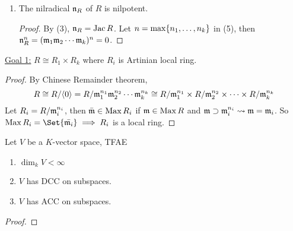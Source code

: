 \begin{prop}
\begin{enumerate}[(1)]
\begin{proof}
        So there exists $x \in J_0$ s.t. $x \mf_1^{n_1}\mf_2^{n_2} \dotsm \mf_k^{n_k} \ne 0$.
        We know that $\gen{x} \subseteq J_0 \leadsto J_0 = \gen{x}$.
        We also find that $x \mf_1^{n_1+1}\mf_2^{n_2+1} \dotsm \mf_k^{n_k+1} =
        x \mf_1^{n_1}\mf_2^{n_2} \dotsm \mf_k^{n_k} \ne 0$.
        This implies $x\mf_1\mf_2 \dotsm \mf_k \in \Sc$. But
        $x\mf_1\mf_2 \dotsm \mf_k \subseteq \gen{x} = J_0 \implies$
        $x\mf_1\mf_2 \dotsm \mf_k = \gen{x} = xR$.
        Write
        \[
          (\mf_1\mf_2 \dotsm \mf_k) x R = xR \leadsto
          (\mf_1 \cap \mf_2 \cap \dotsm \cap \mf_k) x R = xR \leadsto
          (\Jac R) xR = xR
        \]
        By Nakayama's lemma, $xR = 0 \implies x = 0$, which is a contradiction.
      \end{proof}
    \item The nilradical $\mathfrak{n}_R$ of $R$ is nilpotent.
      \begin{proof}
        By (3), $\mathfrak{n}_R = \operatorname{Jac} R$. Let $n = \max \lbrace n_1, \dots, n_k\rbrace$ in (5),
        then $\mathfrak{n}_R^n = (\mathfrak{m}_1\mathfrak{m}_2 \dotsm\mathfrak{m}_k)^n = 0$.
      \end{proof}
  \end{enumerate}
\end{prop}

\underline{Goal 1:} $R \cong R_1 \times R_k$ where $R_i$ is Artinian local ring.
\begin{proof}
  By Chinese Remainder theorem,
  \[
    R \cong {R}/{\langle0\rangle} = {R}/{\mathfrak{m}_1^{n_1}\mathfrak{m}_2^{n_2} \dotsm \mathfrak{m}_k^{n_k}}
    \cong 
    {R}/{\mathfrak{m}_1^{n_1}} \times {R}/{\mathfrak{m}_2^{n_2}} \times \dots \times {R}/{\mathfrak{m}_k^{n_k}}
  \]
  Let $R_i = {R}/{\mathfrak{m}_i^{n_i}}$, then $\bar{\mathfrak{m}} \in \operatorname{Max} R_i$ if
  $\mathfrak{m} \in \operatorname{Max} R$ and $\mathfrak{m} \supset \mathfrak{m}_i^{n_i} \leadsto \mathfrak{m} = \mathfrak{m}_i$.
  So $\Max R_i = \Set{\bar{\mf_i}} \implies R_i$ is a local ring.
\end{proof}

\begin{lemma}
  Let $V$ be a $K$-vector space, TFAE
  \begin{enumerate}[(1)]
    \item $\dim_k V < \infty$
    \item $V$ has DCC on subspaces.
    \item $V$ has ACC on subspaces.
  \end{enumerate}

  \begin{proof}
  \end{proof}
\end{lemma}

